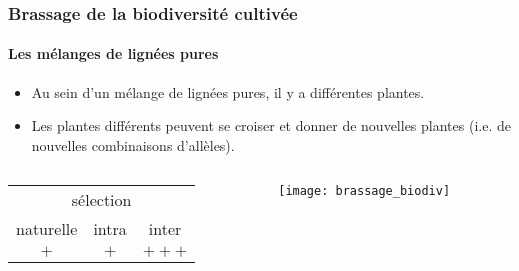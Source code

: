 \begin{frame}
\frametitle{Brassage de la biodiversité cultivée}
\framesubtitle{Les mélanges de lignées pures}

\begin{itemize}
\item Au sein d'un mélange de lignées pures, il y a différentes plantes.
\item Les plantes différents peuvent se croiser et donner de nouvelles plantes (i.e. de nouvelles combinaisons d'allèles).
\end{itemize}


\begin{columns}

\begin{column}{.5\textwidth}

\begin{center}
\begin{tabular}{ccc}
\hline
\multicolumn{3}{c}{sélection} \\
naturelle & intra & inter \\
\hline
$+$ & $+$ & $+++$ \\
\hline
\end{tabular}
\end{center}

\end{column}

\begin{column}{.5\textwidth}
\texttt{[image: brassage\_biodiv]}
\end{column}
\end{columns}


\end{frame}





